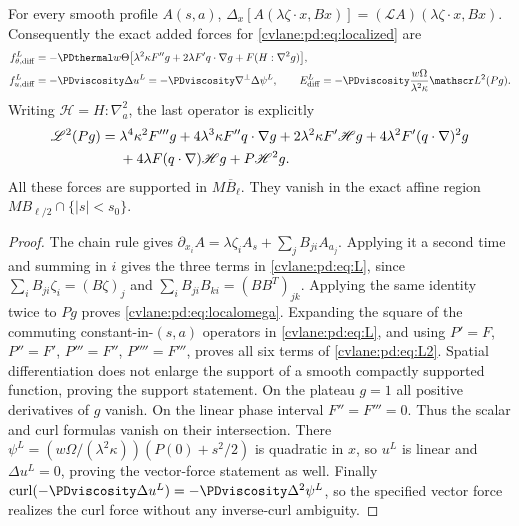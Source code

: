 \begin{cvlanepdproposition}\label{cvlane:pd:prop:localized}
For every smooth profile $A(s,a)$,
$\Delta_x[A(\lambda\zeta\cdot x,Bx)]=
(\mathscr L A)(\lambda\zeta\cdot x,Bx)$.
Consequently the exact added forces for \eqref{cvlane:pd:eq:localized} are
\begin{align}
 f^L_{\theta,\mathrm{diff}}
 &=-\PDthermal w\Theta\big[
 \lambda^2\kappa F''g+2\lambda F' q\cdot\nabla g
                         +F(H:\nabla^2g)\big],\label{cvlane:pd:eq:localtheta}\\
 f^L_{u,\mathrm{diff}}&=-\PDviscosity\Delta u^L
 =-\PDviscosity\nabla^\perp\Delta\psi^L,
 \qquad
 E^L_{\mathrm{diff}}=-\PDviscosity\frac{w\Omega}{\lambda^2\kappa}
       \mathscr L^2(Pg).\label{cvlane:pd:eq:localomega}
\end{align}
Writing $\mathscr H=H:\nabla_a^2$, the last operator is explicitly
\begin{align}\label{cvlane:pd:eq:L2}
 \mathscr L^2(Pg)={}&
 \lambda^4\kappa^2 F'''g
 +4\lambda^3\kappa F''q\cdot\nabla g
 +2\lambda^2\kappa F'\mathscr H g
 +4\lambda^2F'(q\cdot\nabla)^2g\notag\\
 &+4\lambda F(q\cdot\nabla)\mathscr H g
 +P\mathscr H^2g.
\end{align}
All these forces are supported in $M\overline B_\ell$. They vanish in
the exact affine region $M B_{\ell/2}\cap\{|s|<s_0\}$.
\end{cvlanepdproposition}
\begin{proof}
The chain rule gives
$\partial_{x_i}A=\lambda\zeta_i A_s+
\sum_jB_{ji}A_{a_j}$. Applying it a second time and summing in $i$
gives the three terms in \eqref{cvlane:pd:eq:L}, since
$\sum_i B_{ji}\zeta_i=(B\zeta)_j$ and
$\sum_iB_{ji}B_{ki}=(BB^T)_{jk}$. Applying the same identity twice to
$Pg$ proves \eqref{cvlane:pd:eq:localomega}. Expanding the square of the
commuting constant-in-$(s,a)$ operators in \eqref{cvlane:pd:eq:L}, and using
$P'=F$, $P''=F'$, $P'''=F''$, $P''''=F'''$, proves all six terms
of \eqref{cvlane:pd:eq:L2}.
Spatial differentiation does not enlarge the support of a smooth
compactly supported function, proving the support statement.
On the plateau $g=1$ all positive derivatives of $g$ vanish.
On the linear phase interval $F''=F'''=0$. Thus the scalar and curl
formulas vanish on their intersection. There
$\psi^L=(w\Omega/(\lambda^2\kappa))(P(0)+s^2/2)$ is quadratic in $x$,
so $u^L$ is linear and $\Delta u^L=0$, proving the vector-force statement
as well. Finally $\operatorname{curl}(-\PDviscosity\Delta u^L)
=-\PDviscosity\Delta^2\psi^L$, so the specified vector force realizes the
curl force without any inverse-curl ambiguity.
\end{proof}

